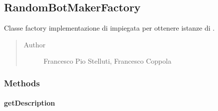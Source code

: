 \documentclass[letterpaper,10pt,italian,openany,oneside]{sphinxmanual}
\begin{document}
\begin{fulllineitems}
\label{\detokenize{test/it/unicam/cs/pa/mastermind/factories/RandomBotBreakerFactory:it.unicam.cs.pa.mastermind.factories.RandomBotBreakerFactory.getName()}}
\end{fulllineitems}



\subsection{RandomBotMakerFactory}
\label{\detokenize{test/it/unicam/cs/pa/mastermind/factories/RandomBotMakerFactory:randombotmakerfactory}}\label{\detokenize{test/it/unicam/cs/pa/mastermind/factories/RandomBotMakerFactory::doc}}

\begin{fulllineitems}
\label{\detokenize{test/it/unicam/cs/pa/mastermind/factories/RandomBotMakerFactory:it.unicam.cs.pa.mastermind.factories.RandomBotMakerFactory}}
Classe factory implementazione di  impiegata per ottenere istanze di .
\begin{quote}\begin{description}
\item[{Author}] \leavevmode
Francesco Pio Stelluti, Francesco Coppola

\end{description}\end{quote}

\end{fulllineitems}



\subsubsection{Methods}
\label{\detokenize{test/it/unicam/cs/pa/mastermind/factories/RandomBotMakerFactory:methods}}

\paragraph{getDescription}
\label{\detokenize{test/it/unicam/cs/pa/mastermind/factories/RandomBotMakerFactory:getdescription}}
\end{document}
